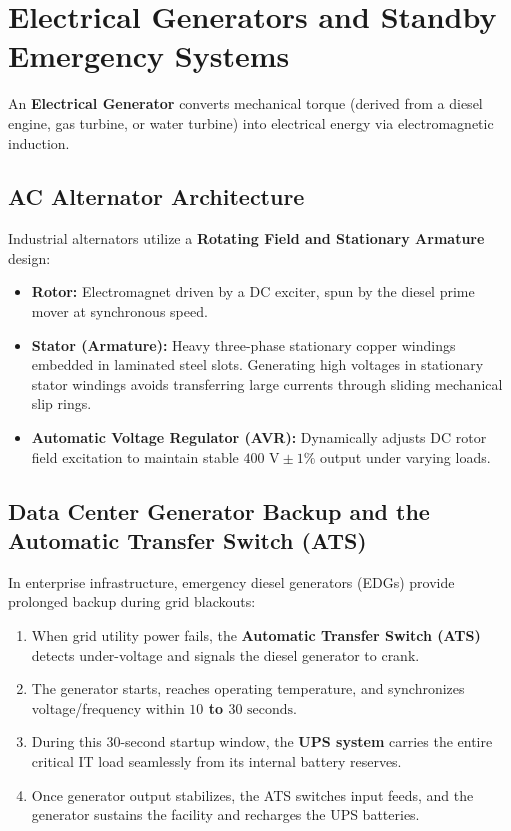 \section{Electrical Generators and Standby Emergency Systems}
\label{sec:generators}

An \textbf{Electrical Generator} converts mechanical torque (derived from a diesel engine, gas turbine, or water turbine) into electrical energy via electromagnetic induction.

\subsection{AC Alternator Architecture}
Industrial alternators utilize a \textbf{Rotating Field and Stationary Armature} design:
\begin{itemize}
    \item \textbf{Rotor:} Electromagnet driven by a DC exciter, spun by the diesel prime mover at synchronous speed.
    \item \textbf{Stator (Armature):} Heavy three-phase stationary copper windings embedded in laminated steel slots. Generating high voltages in stationary stator windings avoids transferring large currents through sliding mechanical slip rings.
    \item \textbf{Automatic Voltage Regulator (AVR):} Dynamically adjusts DC rotor field excitation to maintain stable $400\text{ V} \pm 1\%$ output under varying loads.
\end{itemize}

\subsection{Data Center Generator Backup and the Automatic Transfer Switch (ATS)}
In enterprise infrastructure, emergency diesel generators (EDGs) provide prolonged backup during grid blackouts:
\begin{enumerate}[label=\bfseries\arabic*.]
    \item When grid utility power fails, the \textbf{Automatic Transfer Switch (ATS)} detects under-voltage and signals the diesel generator to crank.
    \item The generator starts, reaches operating temperature, and synchronizes voltage/frequency within \textbf{$10$ to $30\text{ seconds}$}.
    \item During this $30$-second startup window, the \textbf{UPS system} carries the entire critical IT load seamlessly from its internal battery reserves.
    \item Once generator output stabilizes, the ATS switches input feeds, and the generator sustains the facility and recharges the UPS batteries.
\end{enumerate}


